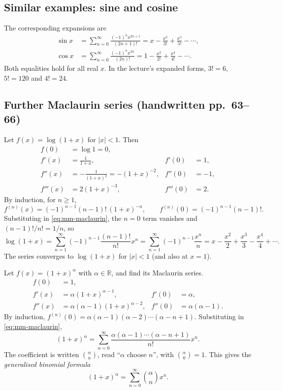 \subsection{Similar examples: sine and cosine}
The corresponding expansions are
\begin{align*}
 \sin x
 &=\sum_{n=0}^{\infty}\frac{(-1)^n x^{2n+1}}{(2n+1)!}
 =x-\frac{x^3}{3!}+\frac{x^5}{5!}-\cdots,\\[4pt]
 \cos x
 &=\sum_{n=0}^{\infty}\frac{(-1)^n x^{2n}}{(2n)!}
 =1-\frac{x^2}{2!}+\frac{x^4}{4!}-\cdots.
\end{align*}
Both equalities hold for all real $x$. In the lecture's expanded forms,
$3!=6$, $5!=120$ and $4!=24$.

\subsection{Further Maclaurin series (handwritten pp.~63--66)}

\begin{example}
Let $f(x)=\log(1+x)$ for $|x|<1$. Then
\begin{align*}
 f(0)&=\log1=0,\\
 f'(x)&=\frac{1}{1+x}, & f'(0)&=1,\\
 f''(x)&=-\frac{1}{(1+x)^2}=-(1+x)^{-2}, & f''(0)&=-1,\\
 f'''(x)&=2(1+x)^{-3}, & f'''(0)&=2.
\end{align*}
By induction, for $n\ge1$,
\[
 f^{(n)}(x)=(-1)^{n-1}(n-1)!\,(1+x)^{-n},
 \qquad f^{(n)}(0)=(-1)^{n-1}(n-1)!.
\]
Substituting in \eqref{eq:mm-maclaurin}, the $n=0$ term vanishes and
$(n-1)!/n!=1/n$, so
\[
 \log(1+x)=\sum_{n=1}^{\infty}(-1)^{n-1}\frac{(n-1)!}{n!}x^n
 =\sum_{n=1}^{\infty}(-1)^{n-1}\frac{x^n}{n}
 =x-\frac{x^2}{2}+\frac{x^3}{3}-\frac{x^4}{4}+\cdots.
\]
The series converges to $\log(1+x)$ for $|x|<1$ (and also at $x=1$).
\end{example}

\begin{example}
Let $f(x)=(1+x)^\alpha$ with $\alpha\in\mathbb R$, and find its Maclaurin series.
\begin{align*}
 f(0)&=1,\\
 f'(x)&=\alpha(1+x)^{\alpha-1}, & f'(0)&=\alpha,\\
 f''(x)&=\alpha(\alpha-1)(1+x)^{\alpha-2}, & f''(0)&=\alpha(\alpha-1).
\end{align*}
By induction, $f^{(n)}(0)=\alpha(\alpha-1)(\alpha-2)\cdots(\alpha-n+1)$.
Substituting in \eqref{eq:mm-maclaurin},
\[
 (1+x)^\alpha
 =\sum_{n=0}^{\infty}\frac{\alpha(\alpha-1)\cdots(\alpha-n+1)}{n!}x^n.
\]
The coefficient is written $\binom{\alpha}{n}$, read ``$\alpha$ choose $n$'',
with $\binom{\alpha}{0}=1$. This gives the \emph{generalised binomial formula}
\begin{equation}
 \boxed{(1+x)^\alpha=\sum_{n=0}^{\infty}\binom{\alpha}{n}x^n}.
 \tag{4}\label{eq:mm-binomial}
\end{equation}
\end{example}


